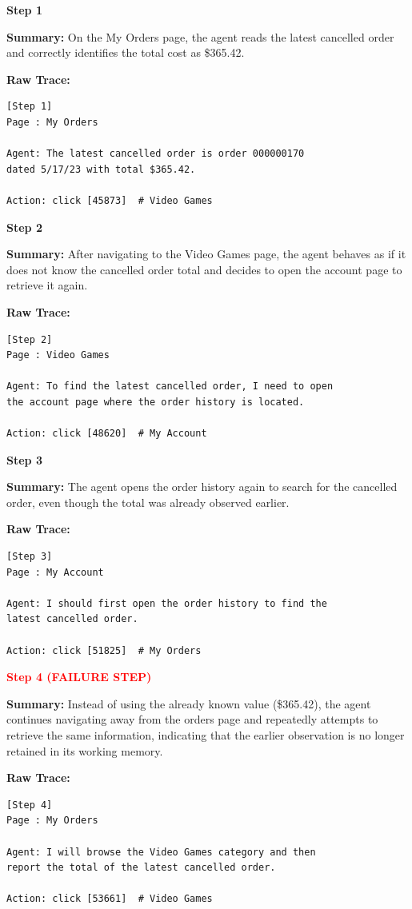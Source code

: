 \documentclass[11pt]{article}
\begin{document}
\begin{tcolorbox}[
breakable,
colback=customwhite,
colframe=customyellow,
title=Memory Limitation,
fontupper=\fontfamily{pcr}\selectfont\scriptsize
]

\textbf{Step 1}

\textbf{Summary:}  
On the My Orders page, the agent reads the latest cancelled order and correctly identifies the total cost as \$365.42.

\textbf{Raw Trace:}
\begin{verbatim}
[Step 1]
Page : My Orders

Agent: The latest cancelled order is order 000000170
dated 5/17/23 with total $365.42.

Action: click [45873]  # Video Games
\end{verbatim}

\medskip
\textbf{Step 2}

\textbf{Summary:}  
After navigating to the Video Games page, the agent behaves as if it does not know the cancelled order total and decides to open the account page to retrieve it again.

\textbf{Raw Trace:}
\begin{verbatim}
[Step 2]
Page : Video Games

Agent: To find the latest cancelled order, I need to open
the account page where the order history is located.

Action: click [48620]  # My Account
\end{verbatim}

\medskip
\textbf{Step 3}

\textbf{Summary:}  
The agent opens the order history again to search for the cancelled order, even though the total was already observed earlier.

\textbf{Raw Trace:}
\begin{verbatim}
[Step 3]
Page : My Account

Agent: I should first open the order history to find the
latest cancelled order.

Action: click [51825]  # My Orders
\end{verbatim}

\medskip
\textbf{\textcolor{red}{Step 4 (FAILURE STEP)}}

\textbf{Summary:}  
Instead of using the already known value (\$365.42), the agent continues navigating away from the orders page and repeatedly attempts to retrieve the same information, indicating that the earlier observation is no longer retained in its working memory.

\textbf{Raw Trace:}
\begin{verbatim}
[Step 4]
Page : My Orders

Agent: I will browse the Video Games category and then
report the total of the latest cancelled order.

Action: click [53661]  # Video Games
\end{verbatim}

\end{tcolorbox}
\end{document}
